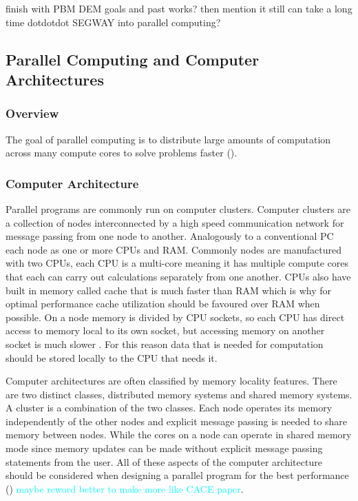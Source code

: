 \documentclass[preprint,11pt,authoryear]{elsarticle}
\begin{document}
		
		\par finish with PBM DEM goals and past works? then mention it still can take a long time dotdotdot SEGWAY into parallel computing?
	
	
	  \subsection{Parallel Computing and Computer Architectures}
	    \subsubsection{Overview}
	    \par The goal of parallel computing is to distribute large amounts of computation across many compute cores to solve problems faster (\cite{wilkinson2005}).
		\subsubsection{Computer Architecture}
	    \par Parallel programs are commonly run on computer clusters. Computer clusters are a collection of nodes interconnected by a high speed communication network for message passing from one node to another. Analogously to a conventional PC each node as one or more CPUs and RAM. Commonly nodes are manufactured with two CPUs, each CPU is a multi-core meaning it has multiple compute cores that each can carry out calculations separately from one another. CPUs also have built in memory called cache that is much faster than RAM which is why for optimal performance cache utilization should be favoured over RAM when possible. On a node memory is divided by CPU sockets, so each CPU has direct access to memory local to its own socket, but accessing memory on another socket is much slower \cite{Jin2011}. For this reason data that is needed for computation should be stored locally to the CPU that needs it.  
	    \par Computer architectures are often classified by memory locality features. There are two distinct classes, distributed memory systems and shared memory systems. A cluster is a combination of the two classes. Each node operates its memory independently of the other nodes and explicit message passing is needed to share memory between nodes. While the cores on a node can operate in shared memory mode since memory updates can be made without explicit message passing statements from the user. All of these aspects of the computer architecture should be considered when designing a parallel program for the best performance (\cite{Adhianto2007}) \textcolor{cyan}{maybe reword better to make more like CACE paper}.
		
\end{document}
